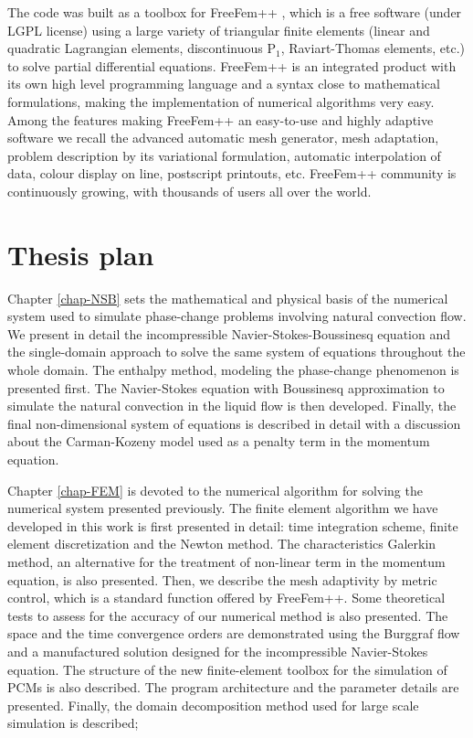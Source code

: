  The code was built as a toolbox for FreeFem++ \citep{hecht-2012-JNM,freefem}, which is a free software (under LGPL license) using a large variety of triangular finite elements  (linear and quadratic Lagrangian elements, discontinuous P$_1$, Raviart-Thomas elements, etc.)  to solve partial differential equations. FreeFem++ is an integrated product with its own high level programming language and a syntax close to mathematical formulations, making the implementation of numerical algorithms very easy. Among the features making FreeFem++ an easy-to-use and highly adaptive  software we recall the advanced automatic mesh generator, mesh adaptation, problem description by its variational formulation, automatic interpolation of data, colour display on line, postscript printouts, etc. FreeFem++ community is continuously growing, with  thousands of users all over the world.

\section{Thesis plan}
Chapter \ref{chap-NSB} sets the mathematical and physical basis of the numerical system used to simulate phase-change problems involving natural convection flow.
We present in detail the incompressible Navier-Stokes-Boussinesq equation and the single-domain approach to solve the same system of equations throughout the whole domain.
The enthalpy method, modeling the phase-change phenomenon is presented first.
The Navier-Stokes equation with Boussinesq approximation to simulate the natural convection in the liquid flow is then developed.
Finally, the final non-dimensional system of equations is described in detail with a discussion about the Carman-Kozeny model used as a penalty term in the momentum equation.

Chapter \ref{chap-FEM} is devoted to the numerical algorithm for solving the numerical system presented previously.
The finite element algorithm we have developed in this work is first presented in detail: time integration scheme, finite element discretization and the Newton method.
The characteristics Galerkin method, an alternative for the treatment of non-linear term in the momentum equation, is also presented.
Then, we describe the mesh adaptivity by metric control, which is a standard function offered by FreeFem++.
Some theoretical tests to assess for the accuracy of our numerical method is also presented.
The space and the time convergence orders are demonstrated using the Burggraf flow and a manufactured solution designed for the incompressible Navier-Stokes equation.
The structure of the new finite-element toolbox for the simulation of PCMs is also described.
The program architecture and the parameter details are presented.
Finally, the domain decomposition method used for large scale simulation is described;

